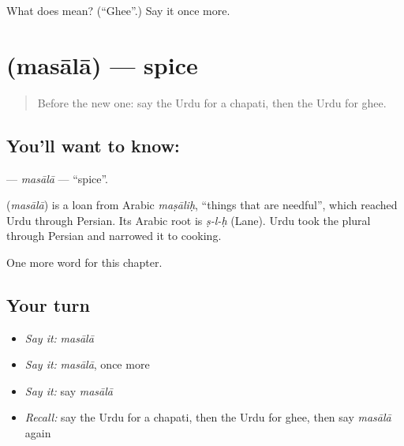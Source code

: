 \begin{tcolorbox}[breakable,colback=teal!4,colframe=teal!35!black,title={Before you move on}]
What does  mean? (\textquotedblleft{}Ghee\textquotedblright{}.) Say it once more.
\end{tcolorbox}
\section[\texorpdfstring{\ur{مسالہ} (masālā)}{مسالہ (masālā)}]{ (masālā) — spice}

\label{lesson:UR-C199-masala}



\begin{quote}
Before the new one: say the Urdu for a chapati, then the Urdu for ghee.
\end{quote}

\subsection*{You'll want to know: }
\textbf{} — \emph{masālā} — \textquotedblleft{}spice\textquotedblright{}.

\begin{cousinweb}
\textbf{} (\emph{masālā}) is a loan from Arabic \emph{maṣāliḥ}, \textquotedblleft{}things that are needful\textquotedblright{}, which reached Urdu through Persian. Its Arabic root is \emph{ṣ-l-ḥ} (Lane). Urdu took the plural through Persian and narrowed it to cooking.
\end{cousinweb}

\begin{grammarlens}[title={What you've built}]
One more word for this chapter.
\end{grammarlens}

\subsection*{Your turn}
\begin{itemize}
\raggedright
  \item \emph{Say it:} \emph{masālā}
  \item \emph{Say it:} \emph{masālā}, once more
  \item \emph{Say it:} say \emph{masālā}
  \item \emph{Recall:} say the Urdu for a chapati, then the Urdu for ghee, then say \emph{masālā} again
\end{itemize}

